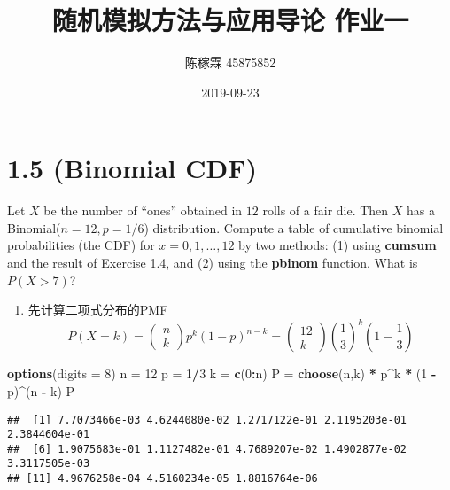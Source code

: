 \documentclass[]{article}
\title{随机模拟方法与应用导论 作业一}
\author{陈稼霖 45875852}
\date{2019-09-23}
\newenvironment{Shaded}{\begin{snugshade}}{\end{snugshade}}
\newcommand{\DataTypeTok}[1]{\textcolor[rgb]{0.13,0.29,0.53}{#1}}
\newcommand{\DecValTok}[1]{\textcolor[rgb]{0.00,0.00,0.81}{#1}}
\newcommand{\KeywordTok}[1]{\textcolor[rgb]{0.13,0.29,0.53}{\textbf{#1}}}
\newcommand{\NormalTok}[1]{#1}
\newcommand{\OperatorTok}[1]{\textcolor[rgb]{0.81,0.36,0.00}{\textbf{#1}}}
\newcommand{\StringTok}[1]{\textcolor[rgb]{0.31,0.60,0.02}{#1}}
\providecommand{\tightlist}{%
  \setlength{\itemsep}{0pt}\setlength{\parskip}{0pt}}
\begin{document}
\maketitle

\hypertarget{binomial-cdf}{%
\section{1.5 (Binomial CDF)}\label{binomial-cdf}}

Let \(X\) be the number of ``ones'' obtained in \(12\) rolls of a fair
die. Then \(X\) has a Binomial(\(n = 12,p = 1/6\)) distribution. Compute
a table of cumulative binomial probabilities (the CDF) for
\(x = 0,1,\dots,12\) by two methods: (1) using \textbf{cumsum} and the
result of Exercise 1.4, and (2) using the \textbf{pbinom} function. What
is \(P(X > 7)\)?

\begin{enumerate}
\def\labelenumi{(\arabic{enumi})}
\tightlist
\item
  先计算二项式分布的PMF \[
  P(X=k)=\left(\begin{array}{c}n\\k\end{array}\right)p^k\left(1-p\right)^{n-k}=\left(\begin{array}{c}12\\k\end{array}\right)\left(\frac{1}{3}\right)^k\left(1-\frac{1}{3}\right)
  \]
\end{enumerate}

\begin{Shaded}
\begin{Highlighting}[]
\KeywordTok{options}\NormalTok{(}\DataTypeTok{digits =} \DecValTok{8}\NormalTok{)}
\NormalTok{n =}\StringTok{ }\DecValTok{12}
\NormalTok{p =}\StringTok{ }\DecValTok{1}\OperatorTok{/}\DecValTok{3}
\NormalTok{k =}\StringTok{ }\KeywordTok{c}\NormalTok{(}\DecValTok{0}\OperatorTok{:}\NormalTok{n)}
\NormalTok{P =}\StringTok{ }\KeywordTok{choose}\NormalTok{(n,k) }\OperatorTok{*}\StringTok{ }\NormalTok{p}\OperatorTok{^}\NormalTok{k }\OperatorTok{*}\StringTok{ }\NormalTok{(}\DecValTok{1} \OperatorTok{-}\StringTok{ }\NormalTok{p)}\OperatorTok{^}\NormalTok{(n }\OperatorTok{-}\StringTok{ }\NormalTok{k)}
\NormalTok{P}
\end{Highlighting}
\end{Shaded}

\begin{verbatim}
##  [1] 7.7073466e-03 4.6244080e-02 1.2717122e-01 2.1195203e-01 2.3844604e-01
##  [6] 1.9075683e-01 1.1127482e-01 4.7689207e-02 1.4902877e-02 3.3117505e-03
## [11] 4.9676258e-04 4.5160234e-05 1.8816764e-06
\end{verbatim}
\end{document}
